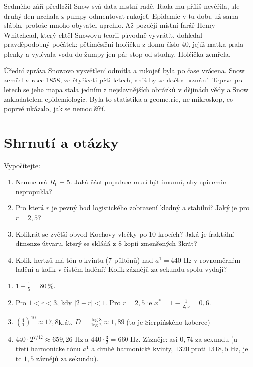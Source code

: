 Sedmého září předložil Snow svá data místní radě. Rada mu příliš nevěřila, ale druhý den nechala z pumpy odmontovat rukojeť. Epidemie v tu dobu už sama slábla, protože mnoho obyvatel uprchlo. Až později místní farář Henry Whitehead, který chtěl Snowovu teorii původně vyvrátit, dohledal pravděpodobný počátek: pětiměsíční holčičku z domu číslo $40$, jejíž matka prala plenky a vylévala vodu do žumpy jen pár stop od studny. Holčička zemřela.

Úřední zpráva Snowovo vysvětlení odmítla a rukojeť byla po čase vrácena. Snow zemřel v roce 1858, ve čtyřiceti pěti letech, aniž by se dočkal uznání. Teprve po letech se jeho mapa stala jedním z nejslavnějších obrázků v dějinách vědy a Snow zakladatelem epidemiologie. Byla to statistika a geometrie, ne mikroskop, co poprvé ukázalo, jak se nemoc šíří.

\section{Shrnutí a otázky}

\begin{problem}
  Vypočítejte:
  \begin{enumerate}[label=(\alph*)]
    \item Nemoc má $R_0 = 5$. Jaká část populace musí být imunní, aby epidemie nepropukla?
    \item Pro která $r$ je pevný bod logistického zobrazení kladný a stabilní? Jaký je pro $r = 2{,}5$?
    \item Kolikrát se zvětší obvod Kochovy vločky po $10$ krocích? Jaká je fraktální dimenze útvaru, který se skládá z $8$ kopií zmenšených $3$krát?
    \item Kolik hertzů má tón o kvintu (7 půltónů) nad $a^1 = 440$ Hz v rovnoměrném ladění a kolik v čistém ladění? Kolik záznějů za sekundu spolu vydají?
  \end{enumerate}
\end{problem}

\begin{solution}
  \begin{enumerate}[label=(\alph*)]
    \item $1 - \frac{1}{5} = 80\,\%$.
    \item Pro $1 < r < 3$, kdy $|2 - r| < 1$. Pro $r = 2{,}5$ je $x^* = 1 - \frac{1}{2{,}5} = 0{,}6$.
    \item $\left(\frac{4}{3}\right)^{10}\approx 17{,}8$krát. $D = \frac{\log 8}{\log 3}\approx 1{,}89$ (to je Sierpińského koberec).
    \item $440\cdot 2^{7/12}\approx 659{,}26$ Hz a $440\cdot\frac{3}{2} = 660$ Hz. Zázněje: asi $0{,}74$ za sekundu (u třetí harmonické tónu $a^1$ a druhé harmonické kvinty, $1320$ proti $1318{,}5$ Hz, je to $1{,}5$ záznějů za sekundu).
  \end{enumerate}
\end{solution}

